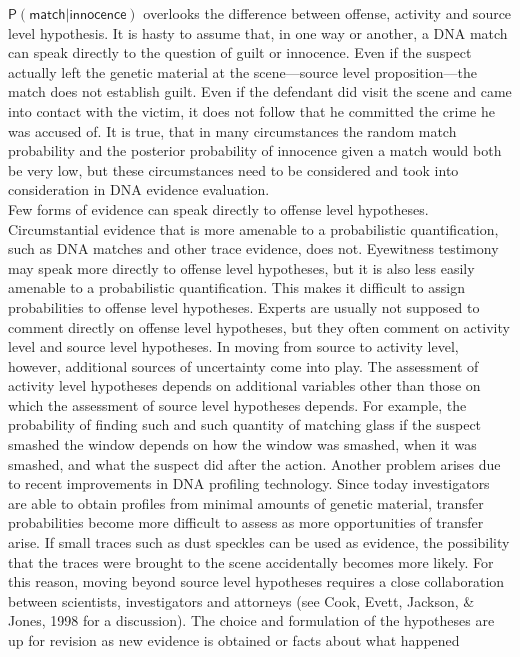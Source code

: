 \documentclass[10pt,dvipsnames,enabledeprecatedfontcommands]{scrartcl}
\newcommand{\pr}[1]{\mathsf{P}(#1)}
\begin{document}
\(\pr{\textsf{match} \vert \textsf{innocence}}\) overlooks the
difference between offense, activity and source level hypothesis. It is
hasty to assume that, in one way or another, a DNA match can speak
directly to the question of guilt or innocence. Even if the suspect
actually left the genetic material at the scene---source level
proposition---the match does not establish guilt. Even if the defendant
did visit the scene and came into contact with the victim, it does not
follow that he committed the crime he was accused of. It is true, that
in many circumstances the random match probability and the posterior
probability of innocence given a match would both be very low, but these
circumstances need to be considered and took into consideration in DNA
evidence evaluation.\\
Few forms of evidence can speak directly to offense level hypotheses.
Circumstantial evidence that is more amenable to a probabilistic
quantification, such as DNA matches and other trace evidence, does not.
Eyewitness testimony may speak more directly to offense level
hypotheses, but it is also less easily amenable to a probabilistic
quantification. This makes it difficult to assign probabilities to
offense level hypotheses. Experts are usually not supposed to comment
directly on offense level hypotheses, but they often comment on activity
level and source level hypotheses. In moving from source to activity
level, however, additional sources of uncertainty come into play. The
assessment of activity level hypotheses depends on additional variables
other than those on which the assessment of source level hypotheses
depends. For example, the probability of finding such and such quantity
of matching glass if the suspect smashed the window depends on how the
window was smashed, when it was smashed, and what the suspect did after
the action. Another problem arises due to recent improvements in DNA
profiling technology. Since today investigators are able to obtain
profiles from minimal amounts of genetic material, transfer
probabilities become more difficult to assess as more opportunities of
transfer arise. If small traces such as dust speckles can be used as
evidence, the possibility that the traces were brought to the scene
accidentally becomes more likely. For this reason, moving beyond source
level hypotheses requires a close collaboration between scientists,
investigators and attorneys (see Cook, Evett, Jackson, \& Jones, 1998
for a discussion). The choice and formulation of the hypotheses are up
for revision as new evidence is obtained or facts about what happened
\end{document}
